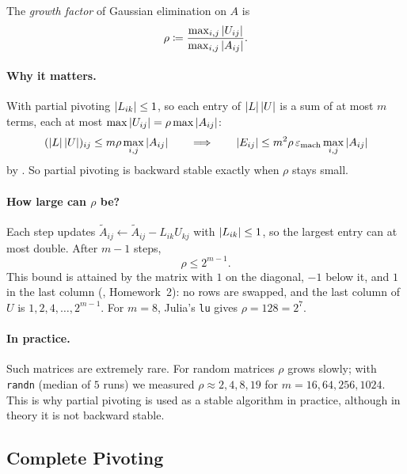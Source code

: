 \begin{definition}
  The \emph{growth factor} of Gaussian elimination on $A$ is
  \begin{equation}
    \rho \coloneqq \frac{\max_{i,j}\left\lvert U_{ij} \right\rvert}{\max_{i,j}\left\lvert A_{ij} \right\rvert}.
  \end{equation}
\end{definition}

\paragraph{Why it matters.} With partial pivoting $\left\lvert L_{ik} \right\rvert \le 1$, so each entry of $\left\lvert L \right\rvert\left\lvert U \right\rvert$ is a sum of at most $m$ terms, each at most $\max\left\lvert U_{ij} \right\rvert = \rho\max\left\lvert A_{ij} \right\rvert$:
\begin{equation}
  (\left\lvert L \right\rvert\left\lvert U \right\rvert)_{ij} \le m\rho\max_{i,j}\left\lvert A_{ij} \right\rvert
  \qquad\Longrightarrow\qquad
  \left\lvert E_{ij} \right\rvert \le m^2\rho\,\varepsilon_{\mathrm{mach}}\max_{i,j}\left\lvert A_{ij} \right\rvert
\end{equation}
by . So partial pivoting is backward stable exactly when $\rho$ stays small.

\paragraph{How large can $\rho$ be?} Each step updates $\tilde{A}_{ij} \gets \tilde{A}_{ij} - L_{ik}U_{kj}$ with $\left\lvert L_{ik} \right\rvert \le 1$, so the largest entry can at most double. After $m - 1$ steps,
\begin{equation}
  \rho \le 2^{m-1}.
\end{equation}
This bound is attained by the matrix with $1$ on the diagonal, $-1$ below it, and $1$ in the last column (, Homework~2): no rows are swapped, and the last column of $U$ is $1, 2, 4, \dots, 2^{m-1}$. For $m = 8$, Julia's \texttt{lu} gives $\rho = 128 = 2^7$.

\paragraph{In practice.} Such matrices are extremely rare. For random matrices $\rho$ grows slowly; with \texttt{randn} (median of $5$ runs) we measured $\rho \approx 2, 4, 8, 19$ for $m = 16, 64, 256, 1024$. This is why partial pivoting is used as a stable algorithm in practice, although in theory it is not backward stable.

\subsection{Complete Pivoting}

